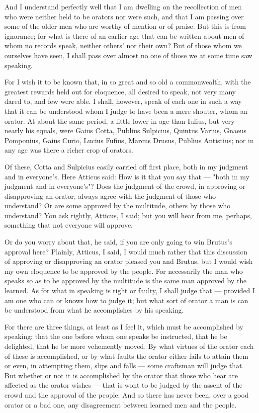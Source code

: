  And I understand perfectly well that I am dwelling on the recollection of men who were neither held to be orators nor were such, and that I am passing over some of the older men who are worthy of mention or of praise. But this is from ignorance; for what is there of an earlier age that can be written about men of whom no records speak, neither others' nor their own? But of those whom we ourselves have seen, I shall pass over almost no one of those we at some time saw speaking.

 For I wish it to be known that, in so great and so old a commonwealth, with the greatest rewards held out for eloquence, all desired to speak, not very many dared to, and few were able. I shall, however, speak of each one in such a way that it can be understood whom I judge to have been a mere shouter, whom an orator. At about the same period, a little lower in age than Iulius, but very nearly his equals, were Gaius Cotta, Publius Sulpicius, Quintus Varius, Gnaeus Pomponius, Gaius Curio, Lucius Fufius, Marcus Drusus, Publius Antistius; nor in any age was there a richer crop of orators.

 Of these, Cotta and Sulpicius easily carried off first place, both in my judgment and in everyone's. Here Atticus said: How is it that you say that — "both in my judgment and in everyone's"? Does the judgment of the crowd, in approving or disapproving an orator, always agree with the judgment of those who understand? Or are some approved by the multitude, others by those who understand? You ask rightly, Atticus, I said; but you will hear from me, perhaps, something that not everyone will approve.

 Or do you worry about that, he said, if you are only going to win Brutus's approval here? Plainly, Atticus, I said, I would much rather that this discussion of approving or disapproving an orator pleased you and Brutus, but I would wish my own eloquence to be approved by the people. For necessarily the man who speaks so as to be approved by the multitude is the same man approved by the learned. As for what in speaking is right or faulty, I shall judge that — provided I am one who can or knows how to judge it; but what sort of orator a man is can be understood from what he accomplishes by his speaking.

 For there are three things, at least as I feel it, which must be accomplished by speaking: that the one before whom one speaks be instructed, that he be delighted, that he be more vehemently moved. By what virtues of the orator each of these is accomplished, or by what faults the orator either fails to attain them or even, in attempting them, slips and falls — some craftsman will judge that. But whether or not it is accomplished by the orator that those who hear are affected as the orator wishes — that is wont to be judged by the assent of the crowd and the approval of the people. And so there has never been, over a good orator or a bad one, any disagreement between learned men and the people.


